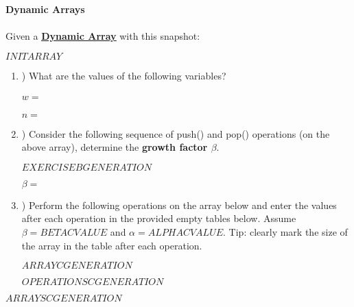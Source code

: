\textbf{\LARGE{\color{tumgadPurple} Dynamic Arrays}}\\
\\
\noindent
Given a \href{https://sebastianoner.github.io/TUMGAD/src/DataStructures/Sequences/Arrays/Arrays}{\textbf{\underline{Dynamic Array}}} with this snapshot:
\begin{center}
    $INITARRAY$
\end{center}
\begin{enumerate}[label=\alph*]
    \item \hspace{-5px}) What are the values of the following variables?\\
    \\
    $w = $\\
    \\
    $n = $
    \\
    \item \hspace{-5px}) Consider the following sequence of push() and pop() operations (on the above array), determine the \textbf{growth factor $\beta$}.
    \begin{center}
        $EXERCISEBGENERATION$
    \end{center}
    $\beta = $\\
    \item \hspace{-5px}) Perform the following operations on the array below and enter the values after each operation in the provided empty
    tables below. Assume $\beta = BETACVALUE$ and $\alpha = ALPHACVALUE$. Tip: clearly mark the size of the array in the table after each operation.
    \begin{center}
        $ARRAYCGENERATION$
    \end{center}
    $OPERATIONSCGENERATION$
\end{enumerate}
\begin{center}
    $ARRAYSCGENERATION$
\end{center}

